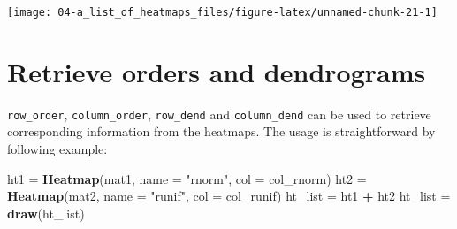 \documentclass[]{book}
\newenvironment{Shaded}{\begin{snugshade}}{\end{snugshade}}
\newcommand{\KeywordTok}[1]{\textcolor[rgb]{0.13,0.29,0.53}{\textbf{#1}}}
\newcommand{\DataTypeTok}[1]{\textcolor[rgb]{0.13,0.29,0.53}{#1}}
\newcommand{\DecValTok}[1]{\textcolor[rgb]{0.00,0.00,0.81}{#1}}
\newcommand{\StringTok}[1]{\textcolor[rgb]{0.31,0.60,0.02}{#1}}
\newcommand{\OperatorTok}[1]{\textcolor[rgb]{0.81,0.36,0.00}{\textbf{#1}}}
\newcommand{\NormalTok}[1]{#1}
\theoremstyle{definition}
\theoremstyle{definition}
\theoremstyle{definition}
\theoremstyle{remark}
\begin{document}
\begin{Shaded}
\end{Shaded}

\begin{center}\texttt{[image: 04-a\_list\_of\_heatmaps\_files/figure-latex/unnamed-chunk-21-1]} \end{center}

\section{Retrieve orders and
dendrograms}\label{retrieve-orders-and-dendrograms}

\texttt{row\_order}, \texttt{column\_order}, \texttt{row\_dend} and
\texttt{column\_dend} can be used to retrieve corresponding information
from the heatmaps. The usage is straightforward by following example:

\begin{Shaded}
\begin{Highlighting}[]
\NormalTok{ht1 =}\StringTok{ }\KeywordTok{Heatmap}\NormalTok{(mat1, }\DataTypeTok{name =} \StringTok{"rnorm"}\NormalTok{, }\DataTypeTok{col =}\NormalTok{ col_rnorm)}
\NormalTok{ht2 =}\StringTok{ }\KeywordTok{Heatmap}\NormalTok{(mat2, }\DataTypeTok{name =} \StringTok{"runif"}\NormalTok{, }\DataTypeTok{col =}\NormalTok{ col_runif)}
\NormalTok{ht_list =}\StringTok{ }\NormalTok{ht1 }\OperatorTok{+}\StringTok{ }\NormalTok{ht2}
\NormalTok{ht_list =}\StringTok{ }\KeywordTok{draw}\NormalTok{(ht_list)}
\end{Highlighting}
\end{Shaded}
\end{document}
